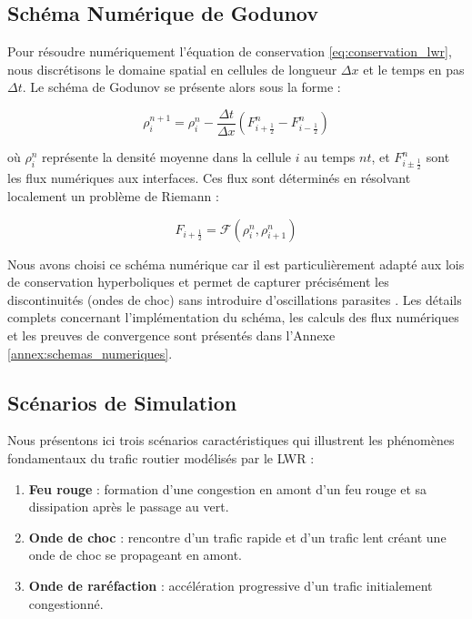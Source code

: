 \subsection{Schéma Numérique de Godunov}
\label{subsec:godunov}

Pour résoudre numériquement l'équation de conservation \eqref{eq:conservation_lwr}, nous discrétisons le domaine spatial en cellules de longueur $\Delta x$ et le temps en pas $\Delta t$. Le schéma de Godunov \cite{godunov1959finite,leveque1992numerical} se présente alors sous la forme :

\begin{equation}
\rho_i^{n+1} = \rho_i^n - \frac{\Delta t}{\Delta x}(F_{i+\frac{1}{2}}^n - F_{i-\frac{1}{2}}^n)
\end{equation}

où $\rho_i^n$ représente la densité moyenne dans la cellule $i$ au temps $n$\Delta$ t$, et $F_{i\pm\frac{1}{2}}^n$ sont les flux numériques aux interfaces. Ces flux sont déterminés en résolvant localement un problème de Riemann :

\begin{equation}
F_{i+\frac{1}{2}} = \mathcal{F}(\rho_i^n, \rho_{i+1}^n)
\end{equation}
    
Nous avons choisi ce schéma numérique car il est particulièrement adapté aux lois de conservation hyperboliques et permet de capturer précisément les discontinuités (ondes de choc) sans introduire d'oscillations parasites \cite{toro2013riemann}. Les détails complets concernant l'implémentation du schéma, les calculs des flux numériques et les preuves de convergence sont présentés dans l'Annexe \ref{annex:schemas_numeriques}.
    
\subsection{Scénarios de Simulation}
\label{subsec:scenarios}

Nous présentons ici trois scénarios caractéristiques qui illustrent les phénomènes fondamentaux du trafic routier modélisés par le LWR :

\begin{enumerate}
    \item \textbf{Feu rouge} : formation d'une congestion en amont d'un feu rouge et sa dissipation après le passage au vert.
    \item \textbf{Onde de choc} : rencontre d'un trafic rapide et d'un trafic lent créant une onde de choc se propageant en amont.
    \item \textbf{Onde de raréfaction} : accélération progressive d'un trafic initialement congestionné.
\end{enumerate}

